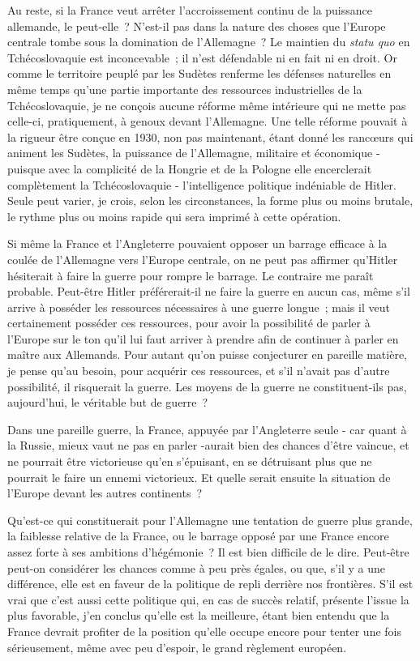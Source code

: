 \documentclass[french,twoside]{book} %
\begin{document}
Au reste, si la France veut arrêter l'accroissement continu de la puissance allemande, le peut-elle ? N'est-il pas dans la nature des choses que l'Europe centrale tombe sous la domination de l'Allemagne ? Le maintien du {\itshape statu quo} en Tchécoslovaquie est inconcevable ; il n'est défendable ni en fait ni en droit. Or comme le territoire peuplé par les Sudètes renferme les défenses naturelles en même temps qu'une partie importante des ressources industrielles de la Tchécoslovaquie, je ne conçois aucune réforme même intérieure qui ne mette pas celle-ci, pratiquement, à genoux devant l'Allemagne. Une telle réforme pouvait à la rigueur être conçue en 1930, non pas maintenant, étant donné les rancœurs qui animent les Sudètes, la puissance de l'Allemagne, militaire et économique - puisque avec la complicité de la Hongrie et de la Pologne elle encerclerait complètement la Tchécoslovaquie - l'intelligence politique indé­niable de Hitler. Seule peut varier, je crois, selon les circonstances, la forme plus ou moins brutale, le rythme plus ou moins rapide qui sera imprimé à cette opération.\par
Si même la France et l'Angleterre pouvaient opposer un barrage efficace à la coulée de l'Allemagne vers l'Europe centrale, on ne peut pas affirmer qu'Hitler hésiterait à faire la guerre pour rompre le barrage. Le contraire me paraît probable. Peut-être Hitler préférerait-il ne faire la guerre en aucun cas, même s'il arrive à posséder les ressources nécessaires à une guerre longue ; mais il veut certainement posséder ces ressources, pour avoir la possibilité de parler à l'Europe sur le ton qu'il lui faut arriver à prendre afin de continuer à parler en maître aux Allemands. Pour autant qu'on puisse conjecturer en pareille matière, je pense qu'au besoin, pour acquérir ces ressources, et s'il n'avait pas d'autre possibilité, il risquerait la guerre. Les moyens de la guerre ne constituent-ils pas, aujourd'hui, le véritable but de guerre ?\par
Dans une pareille guerre, la France, appuyée par l'Angleterre seule - car quant à la Russie, mieux vaut ne pas en parler -aurait bien des chances d'être vaincue, et ne pourrait être victorieuse qu'en s'épuisant, en se détruisant plus que ne pourrait le faire un ennemi victorieux. Et quelle serait ensuite la situa­tion de l'Europe devant les autres continents ?\par
Qu'est-ce qui constituerait pour l'Allemagne une tentation de guerre plus grande, la faiblesse relative de la France, ou le barrage opposé par une France encore assez forte à ses ambitions d'hégémonie ? Il est bien difficile de le dire. Peut-être peut-on considérer les chances comme à peu près égales, ou que, s'il y a une différence, elle est en faveur de la politique de repli derrière nos frontières. S'il est vrai que c'est aussi cette politique qui, en cas de succès relatif, présente l'issue la plus favorable, j'en conclus qu'elle est la meilleure, étant bien entendu que la France devrait profiter de la position qu'elle occupe encore pour tenter une fois sérieusement, même avec peu d'espoir, le grand règlement européen.\par
\end{document}
